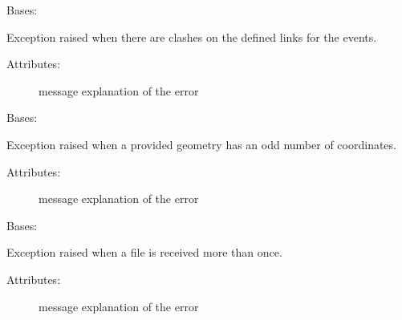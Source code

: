 
\begin{fulllineitems}
\label{\detokenize{eboa.engine:eboa.engine.errors.LinksInconsistency}}
Bases: {\hyperref[\detokenize{eboa.engine:eboa.engine.errors.Error}]{}}

Exception raised when there are clashes on the defined links for the events.
\begin{description}
\item[{Attributes:}] \leavevmode
message \textendash{} explanation of the error

\end{description}

\end{fulllineitems}


\begin{fulllineitems}
\label{\detokenize{eboa.engine:eboa.engine.errors.OddNumberOfCoordinates}}
Bases: {\hyperref[\detokenize{eboa.engine:eboa.engine.errors.Error}]{}}

Exception raised when a provided geometry has an odd number of coordinates.
\begin{description}
\item[{Attributes:}] \leavevmode
message \textendash{} explanation of the error

\end{description}

\end{fulllineitems}


\begin{fulllineitems}
\label{\detokenize{eboa.engine:eboa.engine.errors.SourceAlreadyIngested}}
Bases: {\hyperref[\detokenize{eboa.engine:eboa.engine.errors.Error}]{}}

Exception raised when a file is received more than once.
\begin{description}
\item[{Attributes:}] \leavevmode
message \textendash{} explanation of the error

\end{description}

\end{fulllineitems}


